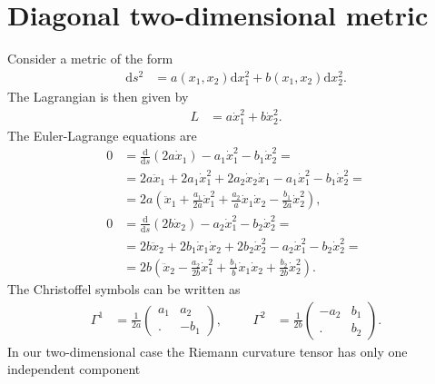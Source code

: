 \documentclass[english, parskip=full]{scrartcl}
\title{\titel}
\author{\autor}
\date{\today}
\newcommand{\kla}{}
\newcommand{\tecxt}{}
\begin{document}
\maketitle  %


\section{Diagonal two-dimensional metric}
Consider a metric of the form
\begin{align}
\tecxt\text{d}s^2 &= a(x_1,x_2) \tecxt\text{d}x_1^2 + b(x_1,x_2)\tecxt\text{d}x_2^2.
\end{align}
The Lagrangian is then given by
\begin{align}
L &= a\dot{x}_1^2 + b\dot{x}_2^2.
\end{align}
The Euler-Lagrange equations are
\begin{align}
0 &= \frac{\tecxt\text{d}}{\tecxt\text{d}s} \kla\left( 2a\dot{x}_1 \right) - a_1\dot{x}_1^2 - b_1\dot{x}_2^2 = \\
&= 2a \ddot{x}_1 + 2a_1\dot{x}_1^2 + 2a_2\dot{x}_2\dot{x}_1 - a_1\dot{x}_1^2 - b_1\dot{x}_2^2 = \\
&= 2a \kla\left( \ddot{x}_1 + \frac{a_1}{2a}\dot{x}_1^2 + \frac{a_2}{a}\dot{x}_1\dot{x}_2 - \frac{b_1}{2a}\dot{x}_2^2 \right),\\
0 &= \frac{\tecxt\text{d}}{\tecxt\text{d}s} \kla\left( 2b\dot{x}_2 \right) - a_2\dot{x}_1^2 - b_2\dot{x}_2^2 = \\
&= 2b\ddot{x}_2 + 2b_1\dot{x}_1\dot{x}_2 + 2b_2\dot{x}_2^2 - a_2\dot{x}_1^2 - b_2\dot{x}_2^2 = \\
&= 2b \kla\left( \ddot{x}_2 - \frac{a_2}{2b}\dot{x}_1^2 + \frac{b_1}{b}\dot{x}_1\dot{x}_2 + \frac{b_2}{2b}\dot{x}_2^2 \right).
\end{align}
The Christoffel symbols can be written as
\begin{align}
\Gamma^1 &= \frac{1}{2a} \begin{pmatrix}
a_1 & a_2 \\ . & -b_1
\end{pmatrix}, &&& \Gamma^2 &= \frac{1}{2b} \begin{pmatrix}
-a_2 & b_1 \\ . & b_2
\end{pmatrix}.
\end{align}
In our two-dimensional case the Riemann curvature tensor has only one independent component
\end{document}
